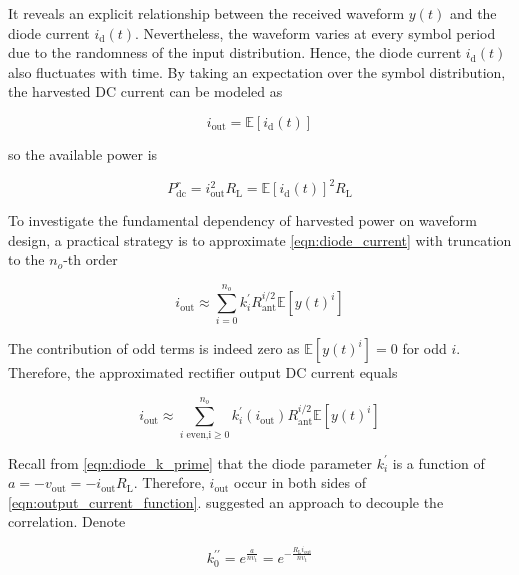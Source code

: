 It reveals an explicit relationship between the received waveform $y(t)$ and the diode current ${i_{\text{d}}}(t)$. Nevertheless, the waveform varies at every symbol period due to the randomness of the input distribution. Hence, the diode current ${i_{\text{d}}}(t)$ also fluctuates with time. By taking an expectation over the symbol distribution, the harvested DC current can be modeled as

\begin{equation}\label{eqn:diode_current_expectation}
  {i_{{\text{out}}}} = \mathbb{E}\left[ {{i_{\text{d}}}(t)} \right]
\end{equation}

so the available power is

\begin{equation}\label{eqn:harvested_power}
  P_{{\text{dc}}}^r = i_{{\text{out}}}^2{R_{\text{L}}} = \mathbb{E}{\left[ {{i_{\text{d}}}(t)} \right]^2}{R_{\text{L}}}
\end{equation}

To investigate the fundamental dependency of harvested power on waveform design, a practical strategy is to approximate \eqref{eqn:diode_current} with truncation to the ${n_o}$-th order

\begin{equation}\label{eqn:output_current_truncation}
  {i_{{\text{out}}}} \approx \sum\limits_{i = 0}^{{n_o}} {k_i^\prime } R_{{\text{ant}}}^{i/2}\mathbb{E}\left[ {y{{(t)}^i}} \right]
\end{equation}

The contribution of odd terms is indeed zero as $\mathbb{E}\left[ {y{{(t)}^i}} \right] = 0$ for odd $i$. Therefore, the approximated rectifier output DC current equals

\begin{equation}\label{eqn:output_current_function}
  {i_{{\text{out}}}} \approx \sum\limits_{i{\text{ even,i}} \geqslant 0}^{{n_o}} {k_i^\prime \left( {{i_{{\text{out}}}}} \right)} R_{{\text{ant}}}^{i/2}\mathbb{E}\left[ {y{{(t)}^i}} \right]
\end{equation}

Recall from \eqref{eqn:diode_k_prime} that the diode parameter $k_i^\prime $ is a function of $a =  - {v_{{\text{out}}}} =  - {i_{{\text{out}}}}{R_{\text{L}}}$. Therefore, ${i_{{\text{out}}}}$ occur in both sides of \eqref{eqn:output_current_function}. \cite{Clerckx2016} suggested an approach to decouple the correlation. Denote

\begin{equation}\label{eqn:diode_k_prime_prime}
  k_0^{\prime \prime } = {e^{\frac{a}{{n{v_{\text{t}}}}}}} = {e^{ - \frac{{{R_{\text{L}}}{i_{{\text{out}}}}}}{{n{v_{\text{t}}}}}}}
\end{equation}

